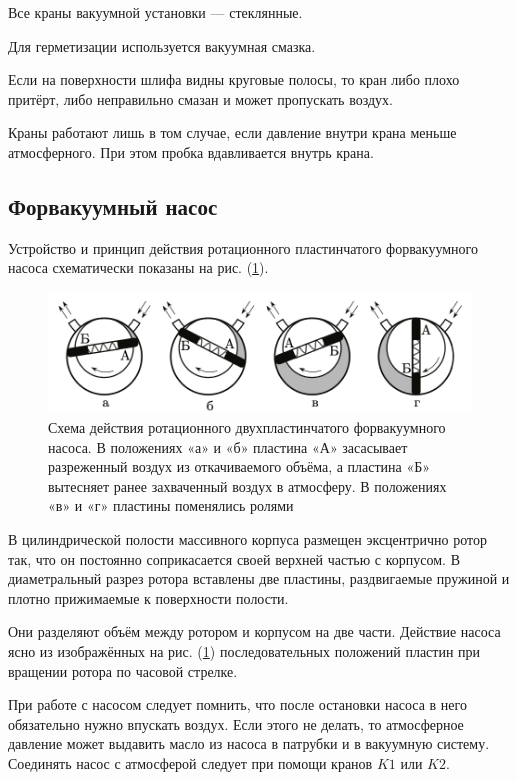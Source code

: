 \documentclass[a4paper,12pt]{article} %
\begin{document}
Все краны вакуумной установки — стеклянные.

Для герметизации используется вакуумная смазка. 

Если на поверхности шлифа видны круговые полосы, то кран либо плохо притёрт, либо неправильно смазан и может пропускать воздух. 

Краны работают лишь в том случае, если давление внутри крана меньше атмосферного. При этом пробка вдавливается внутрь крана.

\subsection*{Форвакуумный насос} 

Устройство и принцип действия ротационного пластинчатого форвакуумного насоса схематически показаны на рис. (\ref{fig:pre-vacuum_pump}).

\begin{figure}[h]
  \centering
  \includegraphics[scale = 0.75]{pre-vacuum_pump.png}
  \caption{\centering Схема действия ротационного двухпластинчатого форвакуумного насоса. В положениях «а» и «б» пластина «А» засасывает разреженный воздух из откачиваемого объёма, а пластина «Б» вытесняет ранее захваченный воздух в атмосферу. В положениях «в» и «г» пластины поменялись ролями}
  \label{fig:pre-vacuum_pump}
\end{figure}

В цилиндрической полости массивного корпуса размещен эксцентрично ротор так, что он постоянно соприкасается своей верхней частью с корпусом. В диаметральный разрез ротора вставлены две пластины, раздвигаемые пружиной и плотно прижимаемые к поверхности полости.

Они разделяют объём между ротором и корпусом на две части. Действие насоса ясно из изображённых на рис. (\ref{fig:pre-vacuum_pump}) последовательных положений пластин при вращении ротора по часовой стрелке. 

При работе с насосом следует помнить, что после остановки насоса в него обязательно нужно впускать воздух. Если этого не делать, то атмосферное давление может выдавить масло из насоса в патрубки и в вакуумную систему. Соединять насос с атмосферой следует при помощи кранов $K1$ или $K2$.
\end{document}
